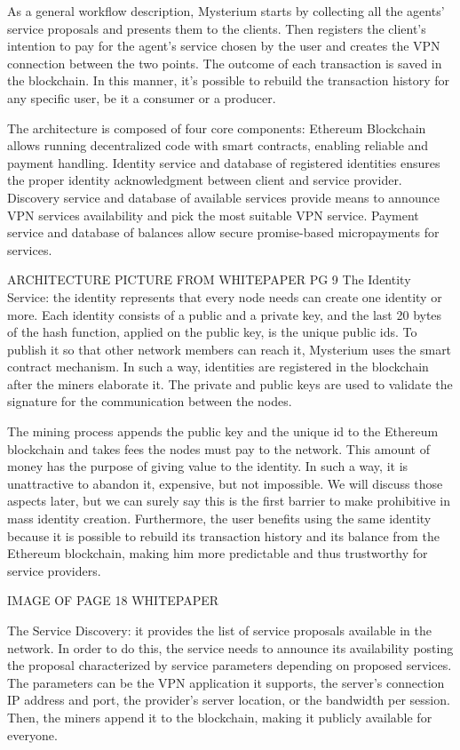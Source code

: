 \documentclass[]{article}
\begin{document}
	As a general workflow description, Mysterium starts by collecting all the agents' service proposals and presents them to the clients. Then registers the client's intention to pay for the agent's service chosen by the user and creates the VPN connection between the two points.
	The outcome of each transaction is saved in the blockchain. In this manner, it's possible to rebuild the transaction history for any specific user, be it a consumer or a producer.
	
	The architecture is composed of four core components:
	Ethereum Blockchain allows running decentralized code with smart contracts, enabling reliable and payment handling.
	Identity service and database of registered identities ensures the proper identity acknowledgment between client and service provider.
	Discovery service and database of available services provide means to announce VPN services availability and pick the most suitable VPN service.
	Payment service and database of balances allow secure promise-based micropayments for services.

	ARCHITECTURE PICTURE FROM WHITEPAPER PG 9
	The Identity Service: the identity represents that every node needs can create one identity or more. Each identity consists of a public and a private key, and the last 20 bytes of the hash function, applied on the public key, is the unique public ids. To publish it so that other network members can reach it, Mysterium uses the smart contract mechanism. In such a way, identities are registered in the blockchain after the miners elaborate it. The private and public keys are used to validate the signature for the communication between the nodes. 

	The mining process appends the public key and the unique id to the Ethereum blockchain and takes fees the nodes must pay to the network. 
	This amount of money has the purpose of giving value to the identity. In such a way, it is unattractive to abandon it, expensive, but not impossible. 
	We will discuss those aspects later, but we can surely say this is the first barrier to make prohibitive in mass identity creation. 
	Furthermore, the user benefits using the same identity because it is possible to rebuild its transaction history and its balance from the Ethereum blockchain, making him more predictable and thus trustworthy for service providers. 


	IMAGE OF PAGE 18 WHITEPAPER

	The Service Discovery: it provides the list of service proposals available in the network. In order to do this, the service needs to announce its availability posting the proposal characterized by service parameters depending on proposed services. The parameters can be the VPN application it supports, the server's connection IP address and port, the provider's server location, or the bandwidth per session. Then, the miners append it to the blockchain, making it publicly available for everyone.
\end{document}
